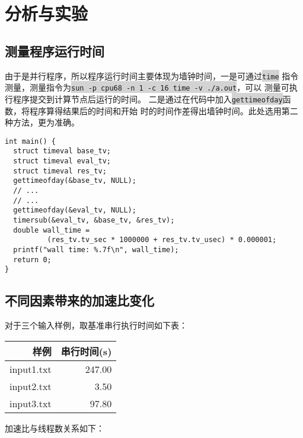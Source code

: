 \documentclass{ctexart}
\newcommand{\mdcode}[1]{\texttt{\colorbox{lightgray}{#1}}}
\begin{document}
\section{分析与实验}
\subsection{测量程序运行时间}
由于是并行程序，所以程序运行时间主要体现为墙钟时间，一是可通过\mdcode{time}
指令测量，测量指令为\mdcode{sun -p cpu68 -n 1 -c 16 time -v ./a.out}，可以
测量可执行程序提交到计算节点后运行的时间。
二是通过在代码中加入\mdcode{gettimeofday}函数，将程序算得结果后的时间和开始
时的时间作差得出墙钟时间。此处选用第二种方法，更为准确。

\begin{lstlisting}[caption={计算运行时间}]
int main() {
  struct timeval base_tv;
  struct timeval eval_tv;
  struct timeval res_tv;
  gettimeofday(&base_tv, NULL);
  // ...
  // ... 
  gettimeofday(&eval_tv, NULL);
  timersub(&eval_tv, &base_tv, &res_tv);
  double wall_time = 
          (res_tv.tv_sec * 1000000 + res_tv.tv_usec) * 0.000001;
  printf("wall time: %.7f\n", wall_time);
  return 0;
}
\end{lstlisting}


\subsection{不同因素带来的加速比变化}
对于三个输入样例，取基准串行执行时间如下表：

\begin{center}
\begin{tabular}{|rr|}
  \hline
  样例       & 串行时间(s) \\
  \hline
  input1.txt & 247.00      \\
  input2.txt & 3.50        \\
  input3.txt & 97.80       \\
  \hline
\end{tabular}
\end{center}

加速比与线程数关系如下：

\begin{center}
\end{center}
\end{document}
